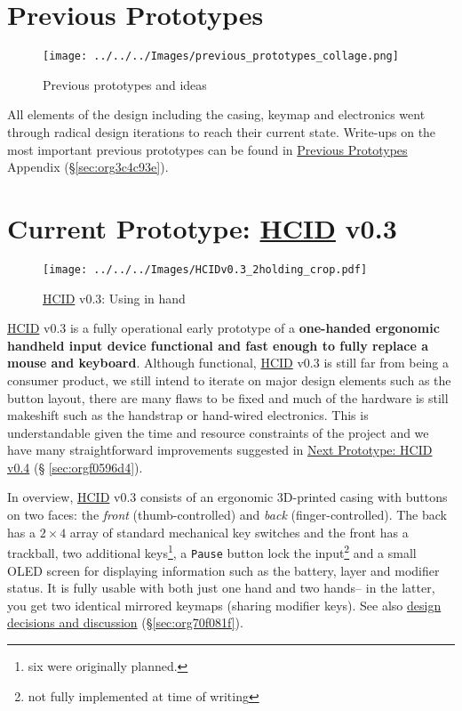 \documentclass[logo,bsc,singlespacing,parskip]{infthesis}
\begin{document}
\chapter{Previous Prototypes}
\label{sec:org07d55de}
\begin{figure}[h]
\centering
\texttt{[image: ../../../Images/previous\_prototypes\_collage.png]}
\caption{Previous prototypes and ideas}
\end{figure}

All elements of the design including the casing, keymap and electronics went through radical design iterations to reach their current state.
Write-ups on the most important previous prototypes can be found in \hyperref[sec:org3c4c93e]{Previous Prototypes}  Appendix (\S \ref{sec:org3c4c93e}).


\chapter{Current Prototype: \hyperref[org0c83164]{HCID} v0.3}
\label{sec:org25f7bc2}
\begin{figure}[h]
\centering
\texttt{[image: ../../../Images/HCIDv0.3\_2holding\_crop.pdf]}
\caption{\hyperref[org0c83164]{HCID} v0.3: Using in hand}
\end{figure}

\hyperref[org0c83164]{HCID} v0.3 is a fully operational early prototype of a \textbf{one-handed ergonomic handheld input device functional and fast enough to fully replace a mouse and keyboard}.
Although functional, \hyperref[org0c83164]{HCID} v0.3 is still far from being a consumer product, we still intend to iterate on major design elements such as the button layout, there are many flaws to be fixed and much of the hardware is still makeshift such as the handstrap or hand-wired electronics.
This is understandable given the time and resource constraints of the project and we have many straightforward improvements suggested in \hyperref[sec:orgf0596d4]{Next Prototype: HCID v0.4}  (§ \ref{sec:orgf0596d4}).

In overview, \hyperref[org0c83164]{HCID} v0.3 consists of an ergonomic 3D-printed casing with buttons on two faces: the \emph{front} (thumb-controlled) and \emph{back} (finger-controlled).
The back has a \(2\times4\) array of standard mechanical key switches and the front has a trackball, two additional keys\footnote{six were originally planned.}, a \texttt{Pause} button lock the input\footnote{not fully implemented at time of writing} and a small OLED screen for displaying information such as the battery, layer and modifier status.
It is fully usable with both just one hand and two hands-- in the latter, you get two identical mirrored keymaps (sharing modifier keys).
See also \hyperref[sec:org70f081f]{design decisions and discussion} (\S \ref{sec:org70f081f}).
\end{document}
